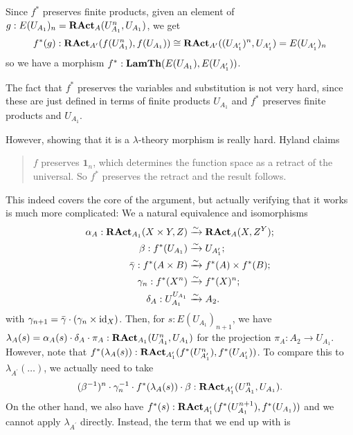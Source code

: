 \begin{definition}
  Since $ f^* $ preserves finite products, given an element of $ g: E(U_{A_1})_n = \mathbf{RAct}_{A}(U_{A_1}^n, U_{A_1}) $, we get
  \[ f^*(g): \mathbf{RAct}_{A^\prime}(f(U_{A_1}^n), f(U_{A_1})) \cong \mathbf{RAct}_{A^\prime}((U_{A^\prime_1})^n, U_{A^\prime_1}) = E(U_{A^\prime_1})_n \]
  so we have a morphism $ f^*: \mathbf{LamTh}(E(U_{A_1}), E(U_{A^\prime_1})) $.
\end{definition}

\begin{remark}
  The fact that $ f^* $ preserves the variables and substitution is not very hard, since these are just defined in terms of finite products $ U_{A_1} $ and $ f^* $ preserves finite products and $ U_{A_1} $.

  However, showing that it is a $ \lambda $-theory morphism is really hard. Hyland claims
  \begin{quote}
    $ f $ preserves $ \mathbf 1_n $, which determines the function space as a retract of the universal. So $ f^* $ preserves the retract and the result follows.
  \end{quote}
  This indeed covers the core of the argument, but actually verifying that it works is much more complicated: We a natural equivalence and isomorphisms
  \begin{align*}
    \alpha_A: \mathbf{RAct}_{A_1}(X \times Y, Z) &\xrightarrow{\sim} \mathbf{RAct}_{A}(X, Z^Y);\\
    \beta: f^*(U_{A_1}) &\xrightarrow{\sim} U_{A_1^\prime};\\
    \bar \gamma: f^*(A \times B) &\xrightarrow{\sim} f^*(A) \times f^*(B);\\
    \gamma_n: f^*(X^n) &\xrightarrow{\sim} f^*(X)^n;\\
    \delta_A: U_{A_1}^{U_{A_1}} &\xrightarrow{\sim} A_2.
  \end{align*}
  with $ \gamma_{n + 1} = \bar{\gamma} \cdot (\gamma_n \times \text{id}_{X}) $.
  Then, for $ s: E(U_{A_1})_{n + 1} $, we have $ \lambda_A(s) = \alpha_A(s) \cdot \delta_A \cdot \pi_A : \mathbf{RAct}_{A_1}(U_{A_1}^n, U_{A_1}) $ for the projection $ \pi_A: A_2 \to U_{A_1} $. However, note that $ f^*(\lambda_A(s)): \mathbf{RAct}_{A^\prime_1}(f^*(U_{A^\prime_1}^n), f^*(U_{A^\prime_1})) $. To compare this to $ \lambda_{A^\prime}(\dots) $, we actually need to take
  \[ (\beta^{-1})^n \cdot \gamma_n^{-1} \cdot f^*(\lambda_A(s)) \cdot \beta : \mathbf{RAct}_{A^\prime_1}(U_{A_1}^n, U_{A_1}). \]
  On the other hand, we also have $ f^*(s): \mathbf{RAct}_{A^\prime_1}(f^*(U_{A_1}^{n + 1}), f^*(U_{A_1})) $ and we cannot apply $ \lambda_{A^\prime} $ directly. Instead, the term that we end up with is

\end{remark}
